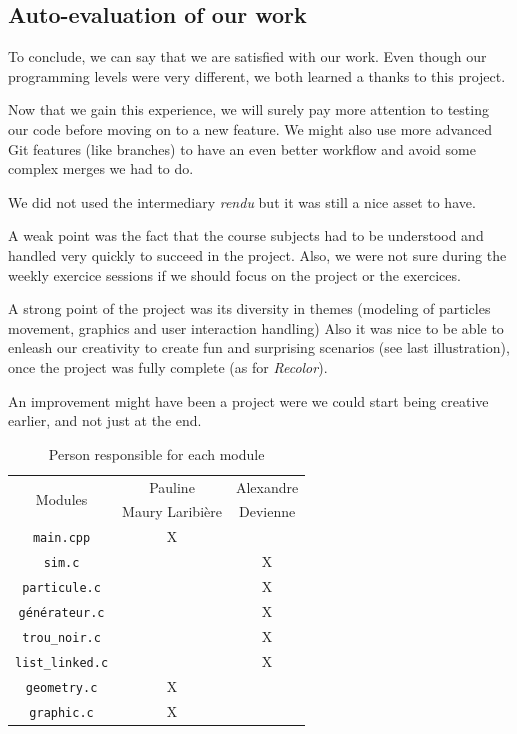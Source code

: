 \documentclass[a4paper]{article} %
\begin{document}
\begin{multicols*}{2}
\subsection{Auto-evaluation of our work}
To conclude, we can say that we are satisfied with our work.
Even though our programming levels were very different,
we both learned a thanks to this project.

Now that we gain this experience, we will surely pay more attention to testing our code
before moving on to a new feature.
We might also use more advanced Git features (like branches) to have an even better workflow and
avoid some complex merges we had to do.

We did not used the intermediary \emph{rendu} but it was still a nice asset to have.

A weak point was the fact that the course subjects had to be understood
and handled very quickly to succeed in the project.
Also, we were not sure during the weekly exercice sessions if we should focus
on the project or the exercices.

A strong point of the project was its diversity in themes (modeling of particles movement, graphics and user interaction handling)
Also it was nice to be able to enleash our creativity to create fun and surprising scenarios (see last illustration),
once the project was fully complete (as for \emph{Recolor}).

An improvement might have been a project were we could start being creative earlier, and not just at the end.

\begin{table}[H]
\begin{center}
\begin{tabular}{|c|c|c|}
\hline
\multicolumn{1}{|c|}{\multirow{2}{*}{Modules}} & Pauline & Alexandre \\
 & Maury Laribière &  Devienne\\
\hline
\hline
\texttt{main.cpp} &  X &\\
\hline
\texttt{sim.c} & &X\\
\hline
\texttt{particule.c} & & X\\
\hline
\texttt{générateur.c} & & X\\
\hline
\texttt{trou\_noir.c} & & X\\
\hline
\texttt{list\_linked.c} & &X\\
\hline
\texttt{geometry.c} & X&\\
\hline
\texttt{graphic.c} & X&\\
\hline
\end{tabular}
\end{center}
\caption{Person responsible for each module}
\label{tab-module}
\end{table}


\end{multicols*}
\end{document}
